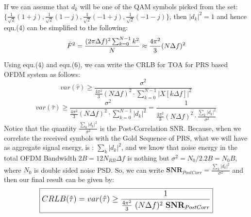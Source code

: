\documentclass{article}
\begin{document}
If we can assume that $d_k$ will be one of the QAM symbols picked from the set: $\{ \frac{1}{\sqrt{2}} (1+j) , \frac{1}{\sqrt{2}} (1-j), \frac{1}{\sqrt{2}} (-1+j), \frac{1}{\sqrt{2}} (-1-j) \}$, then $|d_k|^2 = 1$ and hence equ.(4) can be simplified to the following:
\begin{equation} \label{eq6} \large
\bar{F}^2 = \frac{(2\pi \Delta f)^2 \sum^{N-1}_{k=0}k^2}{N} \approx  \frac{4\pi^2}{3}(N\Delta f)^2
\end{equation}

Using equ.(4) and equ.(6), we can write the CRLB for TOA for PRS based OFDM system as follows:
$$var(\hat{\tau}) \ge \frac{\sigma^2}{\frac{4\pi^2}{3}(N\Delta f)^2 \cdot \sum^{N-1}_{k=0}|X[k\Delta f]|^2}$$ $$ var(\hat{\tau}) \ge \frac{\sigma^2}{\frac{4\pi^2}{3}(N\Delta f)^2 \cdot \sum^{N-1}_{k=0}|d_k|^2} = \frac{1}{\frac{4\pi^2}{3}(N\Delta f)^2 \cdot \frac{\sum_{k}|d_k|^2}{\sigma^2}}$$
Notice that the quantity $\frac{\sum_{k}|d_k|^2}{\sigma^2}$ is the Post-Correlation SNR. Because, when we correlate the received symbols with the Gold Sequence of PRS, what we will have as aggregate signal energy, is : $\sum_{k}|d_k|^2$, and we know that noise energy in the total OFDM Bandwidth $2B = 12N_{RB}\Delta f$ is nothing but $\sigma^2 = N_0/2.2B = N_0B$, where $N_0$ is double sided noise PSD. So, we can write $\mathbf{SNR}_{PostCorr} = \frac{\sum_{k}|d_k|^2}{\sigma^2}$ and then our final result can be given by:
\begin{equation} \label{eq7}
\large
\boxed{CRLB(\hat{\tau}) = var(\hat{\tau}) \ge \frac{1}{\frac{4\pi^2}{3} \ (N\Delta f)^2 \ \mathbf{SNR}_{PostCorr}} }
\end{equation}
\end{document}
